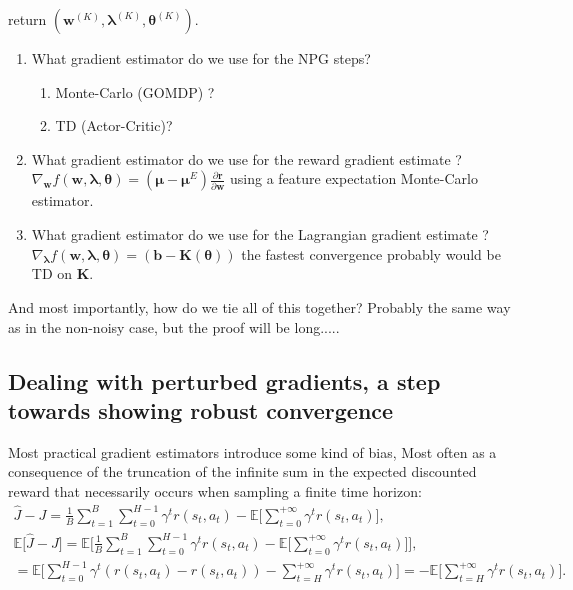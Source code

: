 \begin{algorithm}
      return $(\bm{w}^{(K)},\bm{\lambda}^{(K)},\bm{\theta}^{(K)})$.
  \end{algorithm}

  \begin{enumerate}
    \item What gradient estimator do we use for the NPG steps?
    \begin{enumerate}
        \item Monte-Carlo (GOMDP) ?
        \item TD (Actor-Critic)?
    \end{enumerate}
    \item What gradient estimator do we use for the reward gradient estimate ?  $\nabla_{\bm{w}} f(\bm{w},\bm{\lambda},{\bm{\theta}}) = (\bm{\mu}-\bm{\mu}^E) \frac{\partial \bm{r}}{\partial \bm{w}}$ using a feature expectation Monte-Carlo estimator.
    \item What gradient estimator do we use for the Lagrangian gradient estimate ?  $\nabla_{\bm{\lambda}} f(\bm{w},\bm{\lambda},{\bm{\theta}}) =  (\bm{b}-\bm{K}(\bm{\theta}))$ the fastest convergence probably would be TD on $\bm{K}$.
  \end{enumerate}

  And most importantly, how do we tie all of this together? Probably the same way as in the non-noisy case, but the proof will be long.....


\subsection{Dealing with perturbed gradients, a step towards showing robust convergence}

Most practical gradient estimators introduce some kind of bias, Most often as a consequence of the truncation of the infinite sum in the expected discounted reward that necessarily occurs when sampling a finite time horizon:
\begin{align*}
    \hat{J} - J =  
    \frac{1}{B}
        \sum_{t=1}^{B}  
        \sum_{t=0}^{H-1}  
        \gamma^t r(s_t,a_t) -
        \mathbb{E}\Bigg[
        \sum_{t=0}^{+\infty}  
        \gamma^t r(s_t,a_t)
    \Bigg] ,\\
    \mathbb{E}\big[\hat{J}-J\big] = \mathbb{E}\Bigg[ 
        \frac{1}{B}
         \sum_{t=1}^{B}  
        \sum_{t=0}^{H-1}  
        \gamma^t r(s_t,a_t) -
            \mathbb{E}\Big[
                \sum_{t=0}^{+\infty}  
                \gamma^t r(s_t,a_t)
            \Big]
        \Bigg],  \\
    =\mathbb{E}\Bigg[ 
        \sum_{t=0}^{H-1}  
        \gamma^t (r(s_t,a_t) - r(s_t,a_t) )
        -
        \sum_{t=H}^{+\infty}  
        \gamma^t r(s_t,a_t)
        \Bigg] 
        =
        -
        \mathbb{E}\Bigg[ 
        \sum_{t=H}^{+\infty}  
        \gamma^t r(s_t,a_t)
        \Bigg].
\end{align*}


